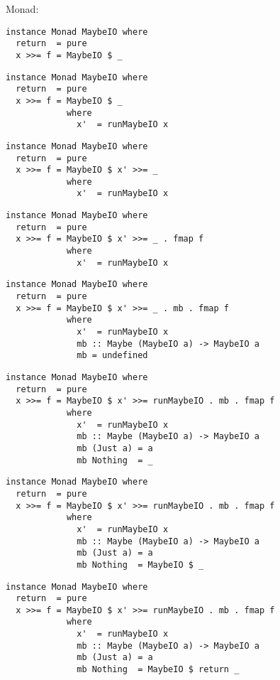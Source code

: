 \documentclass{beamer}
\begin{document}
\begin{frame}[fragile]
Monad:
\begin{overprint}
\begin{verbatim}
instance Monad MaybeIO where
  return  = pure
  x >>= f = MaybeIO $ _
\end{verbatim}
\begin{verbatim}
instance Monad MaybeIO where
  return  = pure
  x >>= f = MaybeIO $ _
            where
              x'  = runMaybeIO x
\end{verbatim}
\begin{verbatim}
instance Monad MaybeIO where
  return  = pure
  x >>= f = MaybeIO $ x' >>= _
            where
              x'  = runMaybeIO x
\end{verbatim}
\begin{verbatim}
instance Monad MaybeIO where
  return  = pure
  x >>= f = MaybeIO $ x' >>= _ . fmap f
            where
              x'  = runMaybeIO x
\end{verbatim}
\begin{verbatim}
instance Monad MaybeIO where
  return  = pure
  x >>= f = MaybeIO $ x' >>= _ . mb . fmap f
            where
              x'  = runMaybeIO x
              mb :: Maybe (MaybeIO a) -> MaybeIO a
              mb = undefined
\end{verbatim}
\begin{verbatim}
instance Monad MaybeIO where
  return  = pure
  x >>= f = MaybeIO $ x' >>= runMaybeIO . mb . fmap f
            where
              x'  = runMaybeIO x
              mb :: Maybe (MaybeIO a) -> MaybeIO a
              mb (Just a) = a
              mb Nothing  = _
\end{verbatim}
\begin{verbatim}
instance Monad MaybeIO where
  return  = pure
  x >>= f = MaybeIO $ x' >>= runMaybeIO . mb . fmap f
            where
              x'  = runMaybeIO x
              mb :: Maybe (MaybeIO a) -> MaybeIO a
              mb (Just a) = a
              mb Nothing  = MaybeIO $ _
\end{verbatim}
\begin{verbatim}
instance Monad MaybeIO where
  return  = pure
  x >>= f = MaybeIO $ x' >>= runMaybeIO . mb . fmap f
            where
              x'  = runMaybeIO x
              mb :: Maybe (MaybeIO a) -> MaybeIO a
              mb (Just a) = a
              mb Nothing  = MaybeIO $ return _
\end{verbatim}

\end{overprint}
\end{frame}
\end{document}
